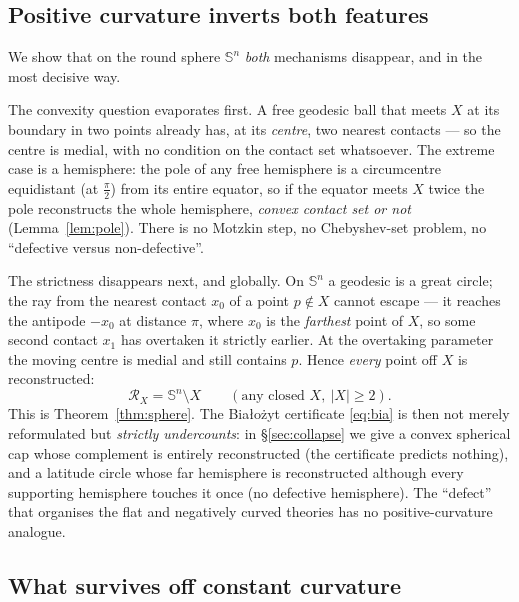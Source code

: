 \documentclass[11pt]{article}
\theoremstyle{remark}
\newcommand{\X}{X}
\newcommand{\Rx}{\mathcal{R}_{\X}}
\newcommand{\Sn}{\mathbb{S}^{n}}
\begin{document}
\subsection*{Positive curvature inverts both features}

We show that on the round sphere $\Sn$ \emph{both} mechanisms disappear,
and in the most decisive way.

The convexity question evaporates first. A free geodesic ball that meets
$\X$ at its boundary in two points already has, at its \emph{centre}, two
nearest contacts --- so the centre is medial, with no condition on the
contact set whatsoever. The extreme case is a hemisphere: the pole of any
free hemisphere is a circumcentre equidistant (at $\tfrac\pi2$) from its
entire equator, so if the equator meets $\X$ twice the pole reconstructs
the whole hemisphere, \emph{convex contact set or not}
(Lemma~\ref{lem:pole}). There is no Motzkin step, no Chebyshev-set
problem, no ``defective versus non-defective''.

The strictness disappears next, and globally. On $\Sn$ a geodesic is a
great circle; the ray from the nearest contact $x_{0}$ of a point
$p\notin\X$ cannot escape --- it reaches the antipode $-x_{0}$ at distance
$\pi$, where $x_{0}$ is the \emph{farthest} point of $\X$, so some second
contact $x_{1}$ has overtaken it strictly earlier. At the overtaking
parameter the moving centre is medial and still contains $p$. Hence
\emph{every} point off $\X$ is reconstructed:
\[
  \Rx=\Sn\setminus\X\qquad(\text{any closed }\X,\ |\X|\ge2).
\]
This is Theorem~\ref{thm:sphere}. The Bia\l{}o\.zyt certificate
\eqref{eq:bia} is then not merely reformulated but \emph{strictly
undercounts}: in \S\ref{sec:collapse} we give a convex spherical cap whose
complement is entirely reconstructed (the certificate predicts nothing),
and a latitude circle whose far hemisphere is reconstructed although every
supporting hemisphere touches it once (no defective hemisphere). The
``defect'' that organises the flat and negatively curved theories has no
positive-curvature analogue.

\subsection*{What survives off constant curvature}
\end{document}
